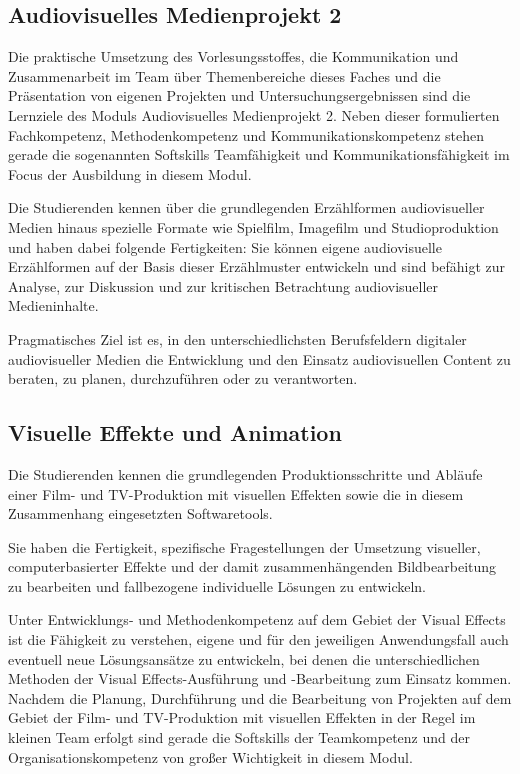 \subsection*{Audiovisuelles Medienprojekt
2\label{/mi-2017/modulbeschreibungen-bachelor/BA_Vertiefung-Visual-Computing}}\label{audiovisuelles-medienprojekt-2pathlabelmi-2017modulbeschreibungen-bachelorbaux5fvertiefung-visual-computing-1}

Die praktische Umsetzung des Vorlesungsstoffes, die Kommunikation und
Zusammenarbeit im Team über Themenbereiche dieses Faches und die
Präsentation von eigenen Projekten und Untersuchungsergebnissen sind die
Lernziele des Moduls Audiovisuelles Medienprojekt 2. Neben dieser
formulierten Fachkompetenz, Methodenkompetenz und
Kommunikationskompetenz stehen gerade die sogenannten Softskills
Teamfähigkeit und Kommunikationsfähigkeit im Focus der Ausbildung in
diesem Modul.

Die Studierenden kennen über die grundlegenden Erzählformen
audiovisueller Medien hinaus spezielle Formate wie Spielfilm, Imagefilm
und Studioproduktion und haben dabei folgende Fertigkeiten: Sie können
eigene audiovisuelle Erzählformen auf der Basis dieser Erzählmuster
entwickeln und sind befähigt zur Analyse, zur Diskussion und zur
kritischen Betrachtung audiovisueller Medieninhalte.

Pragmatisches Ziel ist es, in den unterschiedlichsten Berufsfeldern
digitaler audiovisueller Medien die Entwicklung und den Einsatz
audiovisuellen Content zu beraten, zu planen, durchzuführen oder zu
verantworten.

\subsection*{Visuelle Effekte und
Animation\label{/mi-2017/modulbeschreibungen-bachelor/BA_Vertiefung-Visual-Computing}}\label{visuelle-effekte-und-animationpathlabelmi-2017modulbeschreibungen-bachelorbaux5fvertiefung-visual-computing-1}

Die Studierenden kennen die grundlegenden Produktionsschritte und
Abläufe einer Film- und TV-Produktion mit visuellen Effekten sowie die
in diesem Zusammenhang eingesetzten Softwaretools.

Sie haben die Fertigkeit, spezifische Fragestellungen der Umsetzung
visueller, computerbasierter Effekte und der damit zusammenhängenden
Bildbearbeitung zu bearbeiten und fallbezogene individuelle Lösungen zu
entwickeln.

Unter Entwicklungs- und Methodenkompetenz auf dem Gebiet der Visual
Effects ist die Fähigkeit zu verstehen, eigene und für den jeweiligen
Anwendungsfall auch eventuell neue Lösungsansätze zu entwickeln, bei
denen die unterschiedlichen Methoden der Visual Effects-Ausführung und
-Bearbeitung zum Einsatz kommen. Nachdem die Planung, Durchführung und
die Bearbeitung von Projekten auf dem Gebiet der Film- und TV-Produktion
mit visuellen Effekten in der Regel im kleinen Team erfolgt sind gerade
die Softskills der Teamkompetenz und der Organisationskompetenz von
großer Wichtigkeit in diesem Modul.

